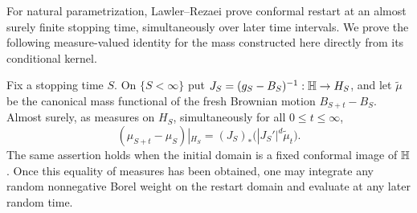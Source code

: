 For natural parametrization, Lawler--Rezaei
\cite[Proposition~3.13]{LawlerRezaei2012Basic} prove conformal restart
at an almost surely finite stopping time, simultaneously over later
time intervals.  We prove the following measure-valued identity for
the mass constructed here directly from its conditional kernel.

\begin{proposition}
\label{mass:restart}
Fix a stopping time $S$.  On $\{S<\infty\}$ put
$J_S=(g_S-B_S)^{-1}:\mathbb H\to H_S$, and let $\widetilde\mu$ be the canonical
mass functional of the fresh Brownian motion $B_{S+t}-B_S$.
Almost surely, as measures on $H_S$, simultaneously for all
$0\le t\le\infty$,
\begin{equation}
 (\mu_{S+t}-\mu_S)|_{H_S}
       =(J_S)_*\bigl(|J_S'|^d\widetilde\mu_t\bigr).
 \label{mass:restart-identity}
\end{equation}
The same assertion holds when the initial domain is a fixed conformal
image of $\mathbb H$.  Once this equality of measures has been obtained,
one may integrate any random nonnegative Borel weight on the restart
domain and evaluate at any later random time.
\end{proposition}


